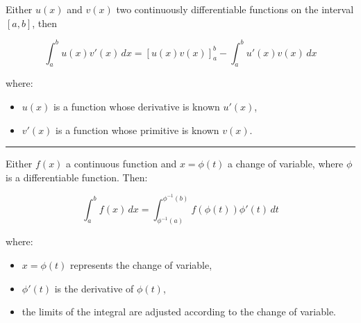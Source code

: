 \begin{f}  

Either \( u(x) \) and \( v(x) \) two continuously differentiable functions on the interval \([a, b]\), then

\[
\int_a^b u(x) v'(x) \, dx = \left[ u(x) v(x) \right]_a^b - \int_a^b u'(x) v(x) \, dx
\]

where:
\begin{itemize}
    \item \( u(x) \) is a function whose derivative is known \( u'(x) \),
    \item \( v'(x) \) is a function whose primitive is known \( v(x) \).
\end{itemize}

\end{f}
\hrule
\begin{f} 

Either \( f(x) \) a continuous function and \( x = \phi(t) \) a change of variable, where \( \phi \) is a differentiable function. Then:

\[
\int_{a}^{b} f(x) \, dx = \int_{\phi^{-1}(a)}^{\phi^{-1}(b)} f(\phi(t)) \phi'(t) \, dt
\]

where:
\begin{itemize}
    \item \( x = \phi(t) \) represents the change of variable,
    \item \( \phi'(t) \) is the derivative of \( \phi(t) \),
    \item the limits of the integral are adjusted according to the change of variable.
\end{itemize}
\end{f}

